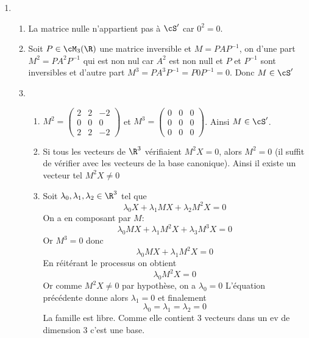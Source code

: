 \begin{correction}
\begin{enumerate}
\begin{enumerate}
\end{enumerate}
\item 
\begin{enumerate}
\item La matrice nulle n'appartient pas à $\cS'$ car $0^2=0$. 
\item Soit $P\in \cM_3(\R)$  une matrice inversible et $M=P A P^{-1} $, on  d'une part
$M^2 = PA^2P^{-1} $ qui est non nul car $A^2$ est non null et $P$ et $P^{-1}$ sont inversibles  et d'autre part  $M^3 =PA^3 P^{-1} = P 0 P^{-1} =0$. Donc $M \in \cS'$
\item \begin{enumerate}
\item $M^2 =\left(\begin{array}{ccc}
2&2&-2\\
0&0&0\\
2&2&-2
\end{array}
\right)  $  et $M^3 = \left(\begin{array}{ccc}
0&0&0\\
0&0&0\\
0&0&0
\end{array}
\right)  $. Ainsi $M\in \cS'$. 
\item Si tous les vecteurs de $\R^3$ vérifiaient $M^2X=0$, alors $M^2 = 0$ (il suffit de vérifier avec les vecteurs de la base canonique). Ainsi il existe un vecteur tel $M^2X\neq 0$
\item Soit $\lambda_0,\lambda_1,\lambda_2\in \R^3$ tel que  
$$\lambda_0 X +\lambda_1 M X +\lambda_2 M^2 X= 0$$
On a en composant par $M:$
$$\lambda_0 M X +\lambda_1 M^2 X +\lambda_3 M^3 X=0$$
Or $M^3 =0 $ donc 
$$\lambda_0 M X +\lambda_1 M^2 X=0$$
En réitérant le processus on obtient 
$$\lambda_0 M^2 X =0  $$
Or comme $M^2X \neq 0$ par hypothèse, on a $\lambda_0=0$ 
L'équation précédente donne alors $\lambda_1=0$ et finalement 
$$\lambda_0=\lambda_1 =\lambda_2 =0$$
La famille est libre. Comme elle contient 3 vecteurs dans un ev de dimension $3$ c'est une base. 


\end{enumerate}
\end{enumerate}

\end{enumerate}
\end{correction}